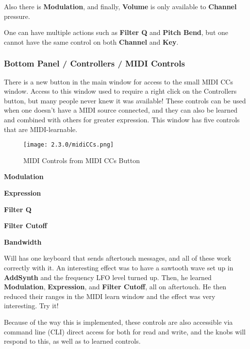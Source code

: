 Also there is \textbf{Modulation}, and finally, \textbf{Volume} is only available
to \textbf{Channel} pressure.

One can have multiple actions such as
\textbf{Filter Q} and \textbf{Pitch Bend},
but one cannot have the same control on both
\textbf{Channel} and \textbf{Key}.

\subsubsection{Bottom Panel / Controllers / MIDI Controls}
\label{subsubsec:bottom_panel_controllers_midi_controls}

   There is a new button in the main window for access to the small MIDI CCs
   window. Access to this window used to require a right click on the
   Controllers button, but many people never knew it was available!  These
   controls can be used when one doesn't have a MIDI source connected, and they
   can also be learned and combined with others for greater expression.  This
   window has five controls that are MIDI-learnable.

\begin{figure}[H]
   \centering
   \texttt{[image: 2.3.0/midiCCs.png]}
   \caption{MIDI Controls from MIDI CCs Button}
   \label{fig:instrument_midi_controllers}
\end{figure}

   \begin{enumber}
      \item \textbf{Modulation}
      \item \textbf{Expression}
      \item \textbf{Filter Q}
      \item \textbf{Filter Cutoff}
      \item \textbf{Bandwidth}
   \end{enumber}

   \setcounter{ItemCounter}{0}      %

   Will has one keyboard that sends aftertouch messages, and all of these work
   correctly with it. An interesting effect was to have a sawtooth wave set up
   in \textbf{AddSynth} and the frequency LFO level turned up.  Then, he
   learned \textbf{Modulation}, \textbf{Expression}, and \textbf{Filter
   Cutoff}, all on aftertouch. He then reduced their ranges in the MIDI learn
   window and the effect was very interesting.  Try it!

   Because of the way this is implemented, these controls are also accessible
   via command line (CLI) direct access for both for read and write, and the
   knobs will respond to this, as well as to learned controls.

